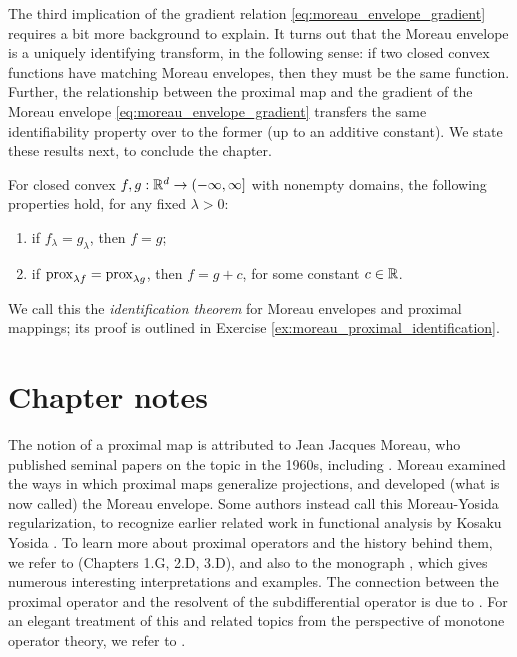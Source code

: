 The third implication of the gradient relation
\eqref{eq:moreau_envelope_gradient} requires a bit more background to
explain. It turns out that the Moreau envelope is a uniquely identifying
transform, in the following sense: if two closed convex functions have matching
Moreau envelopes, then they must be the same function. Further, the relationship
between the proximal map and the gradient of the Moreau envelope
\eqref{eq:moreau_envelope_gradient} transfers the same identifiability property
over to the former (up to an additive constant). We state these results next, to
conclude the chapter.        

\begin{Theorem}
\label{thm:moreau_proximal_identification}
For closed convex $f,g : \mathbb{R}^d \to (-\infty, \infty]$ with nonempty domains, the
following properties hold, for any fixed $\lambda > 0$: 
\begin{enumerate}[label=(\roman*)]
\item if $f_\lambda = g_\lambda$, then $f = g$; 
\item if $\operatorname{prox}_{\lambda f} = \operatorname{prox}_{\lambda g}$, then $f = g + c$, for some
  constant $c \in \mathbb{R}$.  
\end{enumerate} 
\end{Theorem}


We call this the \emph{identification theorem} for Moreau envelopes and proximal
mappings; its proof is outlined in Exercise
\ref{ex:moreau_proximal_identification}.  

\SkipTocEntry\section*{Chapter notes}

The notion of a proximal map is attributed to Jean Jacques Moreau, who published  
seminal papers on the topic in the 1960s, including \cite{moreau1962fonctions,
  moreau1963inf, moreau1963proprietes, moreau1965proximite}. Moreau examined the 
ways in which proximal maps generalize projections, and developed (what is now
called) the Moreau envelope. Some authors instead call this Moreau-Yosida
regularization, to recognize earlier related work in functional analysis by
Kosaku Yosida \cite{yosida1948differentiability}. To learn more about proximal
operators and the history behind them, we refer to
\cite{rockafellar2009variational} (Chapters 1.G, 2.D, 3.D), and also to the
monograph \cite{parikh2013proximal}, which gives numerous interesting
interpretations and examples. The connection between the proximal operator and
the resolvent of the subdifferential operator is due to
\cite{rockafellar1976monotone}. For an elegant treatment of this and related
topics from the perspective of monotone operator theory, we refer to
\cite{bauschke2011convex}.


